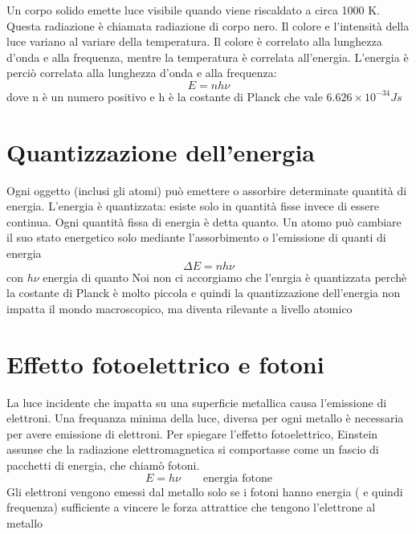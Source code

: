 \documentclass[a4paper,11pt]{report}
\begin{document}
Un corpo solido emette luce visibile quando viene riscaldato a circa 1000 K. Questa radiazione è chiamata radiazione di corpo nero. \newline
Il colore e l'intensità della luce variano al variare della temperatura. Il colore è correlato alla lunghezza d'onda e alla frequenza, mentre la temperatura è correlata all'energia. L'energia è perciò correlata alla lunghezza d'onda e alla frequenza:
\begin{equation*}
	E = nh\nu
\end{equation*}
dove n è un numero positivo e h è la costante di Planck che vale $6.626 \times 10^{-34} Js$

\section{Quantizzazione dell'energia}

Ogni oggetto (inclusi gli atomi) può emettere o assorbire determinate quantità di energia. L'energia è quantizzata: esiste solo in quantità fisse invece di essere continua. Ogni quantità fissa di energia è detta quanto. Un atomo può cambiare il suo stato energetico solo mediante l'assorbimento o l'emissione di quanti di energia
\begin{equation*}
	\Delta E = nh \nu
\end{equation*}
con $h\nu$ energia di quanto \newline
Noi non ci accorgiamo che l'enrgia è quantizzata perchè la costante di Planck è molto piccola e quindi la quantizzazione dell'energia non impatta il mondo macroscopico, ma diventa rilevante a livello atomico

\section{Effetto fotoelettrico e fotoni}

La luce incidente che impatta su una superficie metallica causa l'emissione di elettroni. 
Una frequanza minima della luce, diversa per ogni metallo è necessaria per avere emissione di elettroni.
Per spiegare l'effetto fotoelettrico, Einstein assunse che la radiazione elettromagnetica si comportasse come un fascio di pacchetti di energia, che chiamò fotoni.
\begin{equation*}
	E = h\nu \qquad \text{energia fotone}
\end{equation*}
Gli elettroni vengono emessi dal metallo solo se i fotoni hanno energia ( e quindi frequenza) sufficiente a vincere le forza attrattice che tengono l'elettrone al metallo
\end{document}
